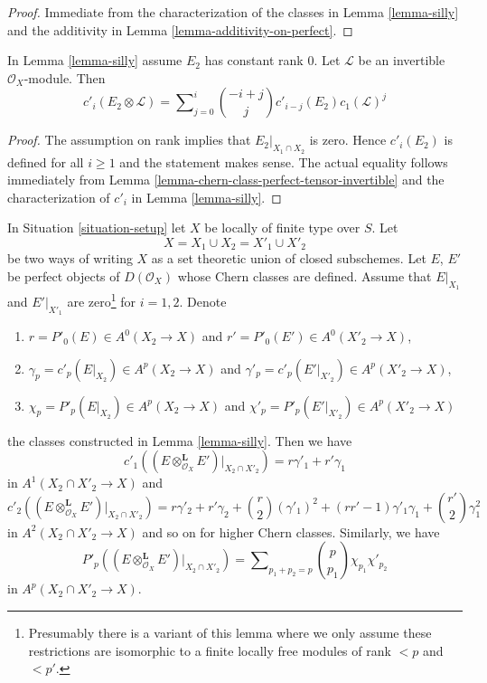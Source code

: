\begin{proof}
Immediate from the characterization of the classes in
Lemma \ref{lemma-silly} and the additivity in
Lemma \ref{lemma-additivity-on-perfect}.
\end{proof}

\begin{lemma}
\label{lemma-silly-tensor-invertible}
In Lemma \ref{lemma-silly} assume $E_2$ has constant rank $0$.
Let $\mathcal{L}$ be an invertible $\mathcal{O}_X$-module. Then
$$
c'_i(E_2 \otimes \mathcal{L}) =
\sum\nolimits_{j = 0}^i
\binom{- i + j}{j} c'_{i - j}(E_2) c_1(\mathcal{L})^j
$$
\end{lemma}

\begin{proof}
The assumption on rank implies that $E_2|_{X_1 \cap X_2}$ is zero.
Hence $c'_i(E_2)$ is defined for all $i \geq 1$ and the statement
makes sense. The actual equality follows
immediately from Lemma \ref{lemma-chern-class-perfect-tensor-invertible}
and the characterization of $c'_i$ in Lemma \ref{lemma-silly}.
\end{proof}

\begin{lemma}
\label{lemma-silly-tensor-product}
In Situation \ref{situation-setup} let $X$ be locally of finite type over $S$.
Let
$$
X = X_1 \cup X_2 = X'_1 \cup X'_2
$$
be two ways of writing $X$ as a set theoretic union of closed subschemes.
Let $E$, $E'$ be perfect objects of $D(\mathcal{O}_X)$
whose Chern classes are defined.
Assume that $E|_{X_1}$ and $E'|_{X'_1}$ are zero\footnote{Presumably there
is a variant of this lemma where we only assume these restrictions are
isomorphic to a finite locally free modules
of rank $< p$ and $< p'$.} for $i = 1, 2$. Denote
\begin{enumerate}
\item $r = P'_0(E) \in A^0(X_2 \to X)$ and
$r' = P'_0(E') \in A^0(X'_2 \to X)$,
\item $\gamma_p = c'_p(E|_{X_2}) \in A^p(X_2 \to X)$ and
$\gamma'_p = c'_p(E'|_{X'_2}) \in A^p(X'_2 \to X)$,
\item $\chi_p = P'_p(E|_{X_2}) \in A^p(X_2 \to X)$ and
$\chi'_p = P'_p(E'|_{X'_2}) \in A^p(X'_2 \to X)$
\end{enumerate}
the classes constructed in Lemma \ref{lemma-silly}. Then we have
$$
c'_1((E \otimes_{\mathcal{O}_X}^\mathbf{L} E')|_{X_2 \cap X'_2}) =
r \gamma'_1 + r' \gamma_1
$$
in $A^1(X_2 \cap X'_2 \to X)$ and
$$
c'_2((E \otimes_{\mathcal{O}_X}^\mathbf{L} E')|_{X_2 \cap X'_2}) =
r \gamma'_2 + r' \gamma_2 + {r \choose 2} (\gamma'_1)^2 +
(rr' - 1) \gamma'_1\gamma_1 + {r' \choose 2} \gamma_1^2
$$
in $A^2(X_2 \cap X'_2 \to X)$ and so on for higher Chern classes.
Similarly, we have
$$
P'_p((E \otimes_{\mathcal{O}_X}^\mathbf{L} E')|_{X_2 \cap X'_2}) =
\sum\nolimits_{p_1 + p_2 = p}
{p \choose p_1} \chi_{p_1} \chi'_{p_2}
$$
in $A^p(X_2 \cap X'_2 \to X)$.
\end{lemma}

